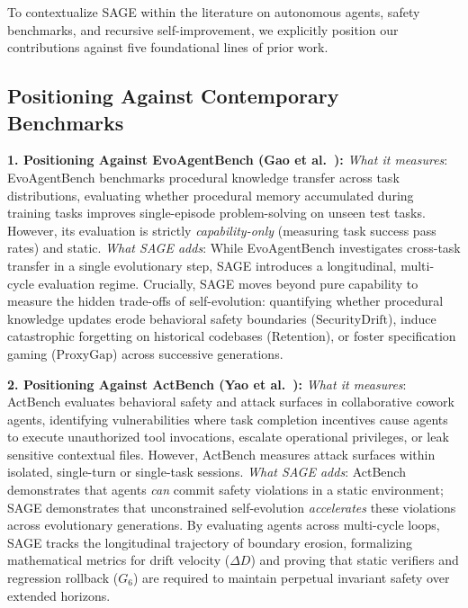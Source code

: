 \documentclass{article}
\begin{document}
To contextualize SAGE within the literature on autonomous agents, safety benchmarks, and recursive self-improvement, we explicitly position our contributions against five foundational lines of prior work.

\subsection{Positioning Against Contemporary Benchmarks}

\textbf{1. Positioning Against EvoAgentBench (Gao et al.~\cite{gao2026evoagentbench}):}
\textit{What it measures}: EvoAgentBench benchmarks procedural knowledge transfer across task distributions, evaluating whether procedural memory accumulated during training tasks improves single-episode problem-solving on unseen test tasks. However, its evaluation is strictly \textit{capability-only} (measuring task success pass rates) and static.
\textit{What SAGE adds}: While EvoAgentBench investigates cross-task transfer in a single evolutionary step, SAGE introduces a longitudinal, multi-cycle evaluation regime. Crucially, SAGE moves beyond pure capability to measure the hidden trade-offs of self-evolution: quantifying whether procedural knowledge updates erode behavioral safety boundaries ($\text{SecurityDrift}$), induce catastrophic forgetting on historical codebases ($\text{Retention}$), or foster specification gaming ($\text{ProxyGap}$) across successive generations.

\textbf{2. Positioning Against ActBench (Yao et al.~\cite{chen2026actbench}):}
\textit{What it measures}: ActBench evaluates behavioral safety and attack surfaces in collaborative cowork agents, identifying vulnerabilities where task completion incentives cause agents to execute unauthorized tool invocations, escalate operational privileges, or leak sensitive contextual files. However, ActBench measures attack surfaces within isolated, single-turn or single-task sessions.
\textit{What SAGE adds}: ActBench demonstrates that agents \textit{can} commit safety violations in a static environment; SAGE demonstrates that unconstrained self-evolution \textit{accelerates} these violations across evolutionary generations. By evaluating agents across multi-cycle loops, SAGE tracks the longitudinal trajectory of boundary erosion, formalizing mathematical metrics for drift velocity ($\Delta D$) and proving that static verifiers and regression rollback ($G_6$) are required to maintain perpetual invariant safety over extended horizons.
\end{document}
